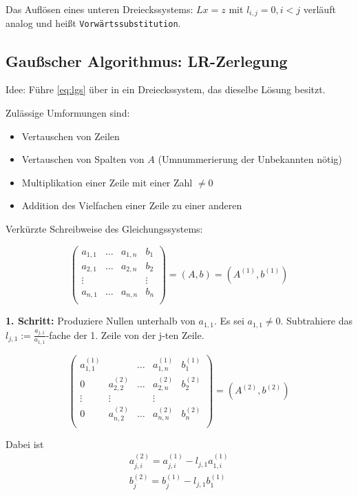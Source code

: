\documentclass[a4paper,10pt]{article}
\newtheorem[L]{satz}{Satz}[section]
\newtheorem[S]{beweis}{Beweis}
\newtheorem[S]{beh}{Behauptung}
\begin{document}
\smallskip

Das Auflösen eines unteren Dreieckssystems: $Lx = z$ mit $l_{i,j}= 0  , i< j$
verläuft analog und heißt \texttt{Vorwärtssubstitution}.

\subsection{Gaußscher Algorithmus: LR-Zerlegung}

Idee: Führe \eqref{eq:lgs} über in ein Dreieckssystem, das dieselbe Lösung besitzt.

Zulässige Umformungen sind:
\begin{itemize}
  \item Vertauschen von Zeilen
  \item Vertauschen von Spalten von $A$ (Umnummerierung der Unbekannten nötig)
  \item Multiplikation einer Zeile mit einer Zahl $\neq 0$
  \item Addition des Vielfachen einer Zeile zu einer anderen
\end{itemize}

Verkürzte Schreibweise des Gleichungssystems:

\[
  \begin{pmatrix}
    a_{1,1} & \dots & a_{1,n} & b_1 \\
    a_{2,1} & \dots & a_{2,n} & b_2 \\
    \vdots & & & \vdots \\
    a_{n,1} & \dots & a_{n,n} & b_n \\
  \end{pmatrix}
  = (A, b) = (A^{(1)}, b^{(1)})
\]

\textbf{1. Schritt:} Produziere Nullen unterhalb von $a_{1,1}$. Es sei $a_{1,1} \neq 0$.
  Subtrahiere das $l_{j,1} := \frac{a_{j,1}}{a_{1,1}}$-fache der 1. Zeile von der j-ten Zeile.

\[
  \begin{pmatrix}
    a_{1,1}^{(1)} & & \dots & a_{1,n}^{(1)} & b_1^{(1)} \\
    0 & a_{2,2}^{(2)} & \dots & a_{2,n}^{(2)} & b_2^{(2)} \\
    \vdots & \vdots & & \vdots \\
    0 & a_{n,2}^{(2)} & \dots & a_{n,n}^{(2)} & b_n^{(2)} \\
  \end{pmatrix}
  = (A^{(2)}, b^{(2)})
\]

Dabei ist
\begin{align*}
  a_{j, i}^{(2)} = a_{j, i}^{(1)} - l_{j, 1} a_{1, i}^{(1)} \\
  b_{j}^{(2)} = b_{j}^{(1)} - l_{j, 1} b_{1}^{(1)} \\
\end{align*}
\end{document}
